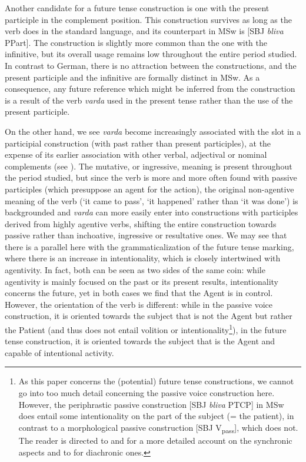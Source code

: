 \documentclass[output=paper,colorlinks,citecolor=brown]{langscibook}
\begin{document}
Another candidate for a future tense construction is one with the present participle in the complement position. This construction survives as long as the verb does in the standard language, and its counterpart in MSw is [SBJ \textit{bliva} PPart]. The construction is slightly more common than the one with the infinitive, but its overall usage remains low throughout the entire period studied. In contrast to German, there is no attraction between the constructions, and the present participle and the infinitive are formally distinct in MSw. As a consequence, any future reference which might be inferred from the construction is a result of the verb \textit{varda} used in the present tense rather than the use of the present participle. 

On the other hand, we see \textit{varda} become increasingly associated with the slot in a participial construction (with past rather than present participles), at the expense of its earlier association with other verbal, adjectival or nominal complements (see ). The mutative, or ingressive, meaning is present throughout the period studied, but since the verb is more and more often found with passive participles (which presuppose an agent for the action), the original non-agentive meaning of the verb (‘it came to pass’, ‘it happened’ rather than ‘it was done’) is backgrounded and \textit{varda} can more easily enter into constructions with participles derived from highly agentive verbs, shifting the entire construction towards passive rather than inchoative, ingressive or resultative ones. We may see that there is a parallel here with the grammaticalization of the future tense marking, where there is an increase in intentionality, which is closely intertwined with agentivity. In fact, both can be seen as two sides of the same coin: while agentivity is mainly focused on the past or its present results, intentionality concerns the future, yet in both cases we find that the Agent is in control. However, the orientation of the verb is different: while in the passive voice construction, it is oriented towards the subject that is not the Agent but rather the Patient (and thus does not entail volition or intentionality\footnote{As this paper concerns the (potential) future tense constructions, we cannot go into too much detail concerning the passive voice construction here. However, the periphrastic passive construction [SBJ \textit{bliva} PTCP] in MSw does entail some intentionality on the part of the subject (= the patient), in contrast to a morphological passive construction [SBJ V\textsubscript{pass}], which does not. The reader is directed to \citet{Engdahl1999} and \citet{Laanemets2012} for a more detailed account on the synchronic aspects and to \citet{Skrzypek2024} for diachronic ones.}), in the future tense construction, it is oriented towards the subject that is the Agent and capable of intentional activity.
\end{document}
